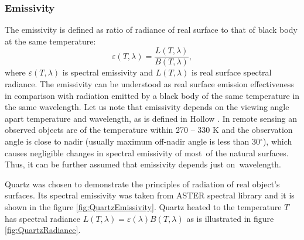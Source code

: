 \subsubsection*{Emissivity}
The emissivity is defined as ratio of radiance of real surface to that of black body at the same temperature:
$$ \varepsilon(T,\lambda) = \frac{L(T,\lambda)}{B(T,\lambda)},$$
where $\varepsilon(T,\lambda)$ is spectral emissivity and $L(T,\lambda)$ is real surface spectral radiance. The emissivity can be understood as real surface emission effectiveness in comparison with radiation emitted by a black body of the same temperature in the same wavelength. Let us note that emissivity depends on the viewing angle apart temperature and wavelength, as is defined in Hollow \cite{H11}. In remote sensing an observed objects are of the temperature within 270 – 330 K and the observation angle is close to nadir (usually maximum off-nadir angle is less than 30$^\circ$), which causes negligible changes in spectral emissivity of most~of the natural surfaces. Thus, it can be further assumed that emissivity depends just on~wavelength. 

Quartz was chosen to demonstrate the principles of radiation of real object's surfaces. Its spectral emissivity was taken from ASTER spectral library \cite{BH09} and it is shown in the figure \ref{fig:QuartzEmissivity}. Quartz heated to the temperature $T$ has spectral radiance $L(T,\lambda) = \varepsilon(\lambda) B(T,\lambda)$ as is illustrated in figure \ref{fig:QuartzRadiance}. 


